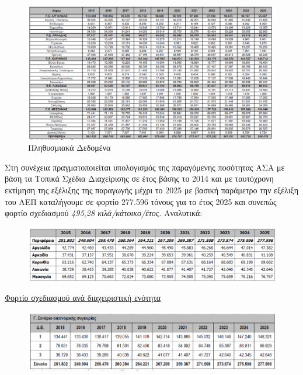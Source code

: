\documentclass[12pt]{article}
\begin{document}
	\begin{figure} [H]
		\begin{center}
			\includegraphics [scale = 0.35] {table3.png}
			\caption{Πληθυσμιακά Δεδομένα}
		\end{center}
	\end{figure}

	Στη συνέχεια πραγματοποιείται υπολογισμός της παραγόμενης ποσότητας ΑΣΑ με βάση τα Τοπικά Σχέδια Διαχείρισης σε έτος βάσης το 2014 και με ταυτόχρονη εκτίμηση της εξέλιξης της παραγωγής μέχρι το 2025 με βασική παράμετρο την εξέλιξη του ΑΕΠ καταλήγουμε σε φορτίο 277.596 τόνους για το έτος 2025 και συνεπώς φορτίο σχεδιασμού \emph{495,28 κιλά/κάτοικο/έτος}. Αναλυτικά:
	
	\begin{figure} [H]
		\begin{center}
			\includegraphics [scale = 0.45] {table4.png}
		\end{center}
	\end{figure}

	\underline{Φορτίο σχεδιασμού ανά διαχειριστική ενότητα}
	
	\begin{figure} [H]
		\begin{center}
			\includegraphics [scale = 0.45] {table5.png}
		\end{center}
	\end{figure}
\end{document}
